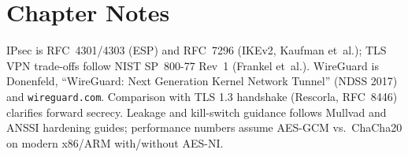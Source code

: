 \section*{Chapter Notes}
IPsec is RFC~4301/4303 (ESP) and RFC~7296 (IKEv2, Kaufman et~al.); TLS VPN
trade-offs follow NIST SP~800-77 Rev~1 (Frankel et~al.). WireGuard is Donenfeld,
``WireGuard: Next Generation Kernel Network Tunnel'' (NDSS 2017) and
\texttt{wireguard.com}. Comparison with TLS 1.3 handshake (Rescorla, RFC~8446)
clarifies forward secrecy. Leakage and kill-switch guidance follows Mullvad and
ANSSI hardening guides; performance numbers assume AES-GCM vs.\ ChaCha20 on
modern x86/ARM with/without AES-NI.
